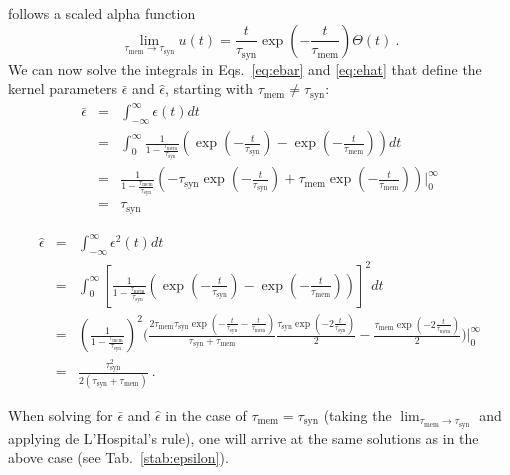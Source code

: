 \documentclass[11pt,a4paper]{article}
\begin{document}
\begin{refsection}
follows a scaled alpha function
\begin{equation}
\lim_{\tau_{\text{mem}}\to\tau_{\text{syn}}} u(t) = \frac{t}{\tau_{\text{syn}}}
\exp\left(-\frac{t}{\tau_{\text{mem}}}\right)\Theta(t)~.
\end{equation}
We can now solve the integrals in Eqs.~\eqref{eq:ebar} and
\eqref{eq:ehat} that define the kernel parameters $\bar\epsilon$ and
$\hat\epsilon$, starting with $\tau_{\text{mem}}\ne\tau_{\text{syn}}$:
\begin{eqnarray}
\bar\epsilon &=& \int_{-\infty}^{\infty}\epsilon(t)dt 
\nonumber 
\\
&=&  \int_{0}^{\infty}\frac{1}{1-\frac{\tau_{\text{mem}}}{\tau_{\text{syn}}}}
\left(\exp(-\frac{t}{\tau_{\text{syn}}})-
\exp(-\frac{t}{\tau_{\text{mem}}})\right)dt 
\nonumber 
\\
&=&\frac{1}{1-\frac{\tau_{\text{mem}}}{\tau_{\text{syn}}}}\left(-\tau_{\text
{syn}}\exp\left(-\frac{t}{\tau_{\text{syn}}}\right)+\tau_{\text{mem}}\exp\left(
-\frac{t}{\tau_{\text{mem}}}\right)\right)\Bigg|_0^\infty 
\nonumber 
\\
&=&\tau_{\text{syn}}
\label{eq:ebar-sol}
\end{eqnarray}

{\small
\begin{eqnarray}
\hat\epsilon &=& \int_{-\infty}^{\infty} \epsilon^2(t)dt 
\nonumber 
\\
&=&\int_{0}^{\infty}\left[\frac{1}{1-\frac{\tau_{\text{mem}}}{\tau_{\text{syn}}
}}
\left(\exp\left(-\frac{t}{\tau_{\text{syn}}}\right) -
\exp\left(-\frac{t}{\tau_{\text{mem}}}\right)\right)\right]^2dt 
\nonumber 
\\
&=& \left(\frac{1}{1-\frac{\tau_{\text{mem}}}{\tau_{\text{syn}}}}\right)^2
\Bigg(\frac{2\tau_{\text{mem}}\tau_{\text{syn}}\exp\left(-\frac{t}{\tau_{\text
{syn}}}-\frac{t}{\tau_{\text{mem}}}\right)}{\tau_{\text{syn}}+\tau_{\text{mem}}
}
 \frac{\tau_{\text{syn}}\exp\left(-2\frac{t}{\tau_{\text{syn}}}\right)}{2}
-\frac{\tau_{\text{mem}}\exp\left(-2\frac{t}{\tau_{\text{mem}}}\right)}{2}\Bigg
) \Bigg|_0^\infty 
\nonumber 
\\
&=& \frac{\tau_{\text{syn}}^2}{2(\tau_{\text{syn}}+\tau_{\text{mem}})}~.
\label{eq:ehat-sol}
\end{eqnarray}
}

When solving for $\bar\epsilon$ and $\hat\epsilon$ in the case of $\tau_{\text{mem}} = \tau_{\text{syn}}$ (taking the $\lim_{\tau_{\text{mem}}\to \tau_{\text{syn}}}$ and applying de L’Hospital's rule), one will arrive at the same solutions as in the above case (see Tab.~\ref{stab:epsilon}).


\end{refsection}
\end{document}
